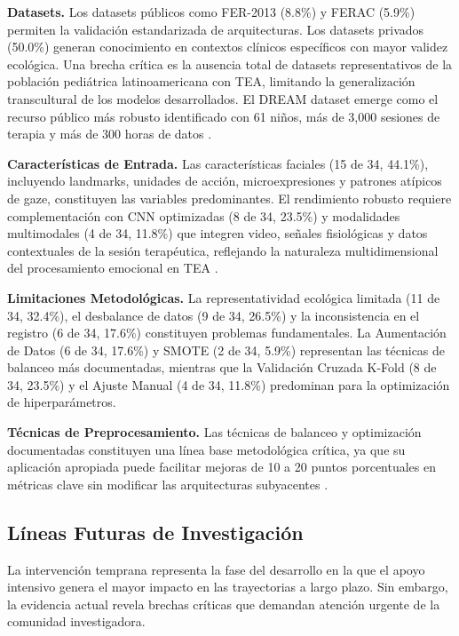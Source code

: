 \documentclass[3p,twocolumn,times]{elsarticle}
\begin{document}
	\textbf{Datasets.} Los datasets públicos como FER-2013 (8.8\%) y FERAC (5.9\%)
	permiten la validación estandarizada de arquitecturas. Los datasets privados
	(50.0\%) generan conocimiento en contextos clínicos específicos con mayor validez
	ecológica. Una brecha crítica es la ausencia total de datasets representativos de
	la población pediátrica latinoamericana con TEA, limitando la generalización
	transcultural de los modelos desarrollados. El DREAM dataset emerge como el recurso
	público más robusto identificado con 61 niños, más de 3{,}000 sesiones de terapia
	y más de 300 horas de datos \cite{Hassan2025}.
	
	\textbf{Características de Entrada.} Las características faciales (15 de 34,
	44.1\%), incluyendo landmarks, unidades de acción, microexpresiones y patrones
	atípicos de gaze, constituyen las variables predominantes. El rendimiento robusto
	requiere complementación con CNN optimizadas (8 de 34, 23.5\%) y modalidades
	multimodales (4 de 34, 11.8\%) que integren video, señales fisiológicas y datos
	contextuales de la sesión terapéutica, reflejando la naturaleza multidimensional
	del procesamiento emocional en TEA \cite{Sariyanidi2025,Leo2018}.
	
	\textbf{Limitaciones Metodológicas.} La representatividad ecológica limitada (11
	de 34, 32.4\%), el desbalance de datos (9 de 34, 26.5\%) y la inconsistencia en el
	registro (6 de 34, 17.6\%) constituyen problemas fundamentales. La Aumentación de
	Datos (6 de 34, 17.6\%) y SMOTE (2 de 34, 5.9\%) representan las técnicas de
	balanceo más documentadas, mientras que la Validación Cruzada K-Fold (8 de 34,
	23.5\%) y el Ajuste Manual (4 de 34, 11.8\%) predominan para la optimización de
	hiperparámetros.
	
	\textbf{Técnicas de Preprocesamiento.} Las técnicas de balanceo y optimización
	documentadas constituyen una línea base metodológica crítica, ya que su aplicación
	apropiada puede facilitar mejoras de 10 a 20 puntos porcentuales en métricas clave
	sin modificar las arquitecturas subyacentes \cite{Alam2025}.
	
	\subsection{Líneas Futuras de Investigación}\label{sec7b}
	
	La intervención temprana representa la fase del desarrollo en la que el apoyo
	intensivo genera el mayor impacto en las trayectorias a largo plazo. Sin embargo,
	la evidencia actual revela brechas críticas que demandan atención urgente de la
	comunidad investigadora.
	
\end{document}
